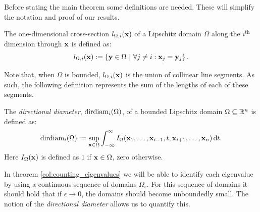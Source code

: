 Before stating the main theorem some definitions are needed. These will simplify the notation and proof of our results.
\begin{definition}
  The one-dimensional cross-section $l_{\Omega,i}(\vb{x})$ of a Lipschitz domain $\Omega$ along the $i^\text{th}$ dimension through $\vb{x}$ is defined as:
  $$
    l_{\Omega,i}(\vb{x}) := \left\{\vb{y} \in \Omega \ |\  \forall j \neq i : \vb{x}_j = \vb{y}_j   \right\}\text{.}
  $$
\end{definition}

Note that, when $\Omega$ is bounded, $l_{\Omega,i}(\vb{x})$ is the union of collinear line segments. As such, the following definition represents the sum of the lengths of each of these segments.

\begin{definition}
  The \emph{directional diameter}, $\operatorname{dirdiam}_i(\Omega)$, of a bounded Lipschitz domain $\Omega \subseteq \mathbb{R}^n$ is defined as:
  $$
    \operatorname{dirdiam}_i(\Omega) := \sup_{\vb{x}\in\Omega} \int_{-\infty}^{\infty} I_\Omega(\vb{x}_1, \dots, \vb{x}_{i-1}, t, \vb{x}_{i+1}, \dots, \vb{x}_n) \, \dd t \text{.}
  $$
  Here $I_\Omega(\vb{x})$ is defined as $1$ if $\vb{x} \in \Omega$, zero otherwise.
\end{definition}

In theorem \ref{col:counting_eigenvalues} we will be able to identify each eigenvalue by using a continuous sequence of domains $\Omega_\epsilon$. For this sequence of domains it should hold that if $\epsilon \to 0$, the domains should become unboundedly small. The notion of the \emph{directional diameter} allows us to quantify this.

